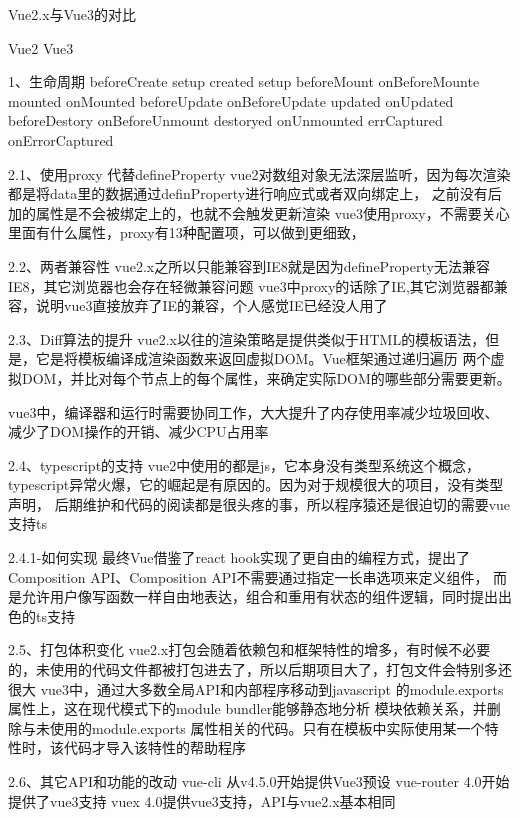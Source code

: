 Vue2.x与Vue3的对比

Vue2                                Vue3

1、生命周期
beforeCreate                        setup
created                             setup
beforeMount                         onBeforeMounte
mounted                             onMounted
beforeUpdate                        onBeforeUpdate
updated                             onUpdated
beforeDestory                       onBeforeUnmount
destoryed                           onUnmounted
errCaptured                         onErrorCaptured

2.1、使用proxy 代替defineProperty
vue2对数组对象无法深层监听，因为每次渲染都是将data里的数据通过definProperty进行响应式或者双向绑定上，
之前没有后加的属性是不会被绑定上的，也就不会触发更新渲染
vue3使用proxy，不需要关心里面有什么属性，proxy有13种配置项，可以做到更细致，

2.2、两者兼容性
vue2.x之所以只能兼容到IE8就是因为defineProperty无法兼容IE8，其它浏览器也会存在轻微兼容问题
vue3中proxy的话除了IE,其它浏览器都兼容，说明vue3直接放弃了IE的兼容，个人感觉IE已经没人用了

2.3、Diff算法的提升
vue2.x以往的渲染策略是提供类似于HTML的模板语法，但是，它是将模板编译成渲染函数来返回虚拟DOM。Vue框架通过递归遍历
两个虚拟DOM，并比对每个节点上的每个属性，来确定实际DOM的哪些部分需要更新。

vue3中，编译器和运行时需要协同工作，大大提升了内存使用率减少垃圾回收、减少了DOM操作的开销、减少CPU占用率


2.4、typescript的支持
vue2中使用的都是js，它本身没有类型系统这个概念，typescript异常火爆，它的崛起是有原因的。因为对于规模很大的项目，没有类型声明，
后期维护和代码的阅读都是很头疼的事，所以程序猿还是很迫切的需要vue支持ts

2.4.1-如何实现
最终Vue借鉴了react hook实现了更自由的编程方式，提出了Composition API、Composition API不需要通过指定一长串选项来定义组件，
而是允许用户像写函数一样自由地表达，组合和重用有状态的组件逻辑，同时提出出色的ts支持


2.5、打包体积变化
vue2.x打包会随着依赖包和框架特性的增多，有时候不必要的，未使用的代码文件都被打包进去了，所以后期项目大了，打包文件会特别多还很大
vue3中，通过大多数全局API和内部程序移动到javascript 的module.exports属性上，这在现代模式下的module bundler能够静态地分析
模块依赖关系，并删除与未使用的module.exports 属性相关的代码。只有在模板中实际使用某一个特性时，该代码才导入该特性的帮助程序

2.6、其它API和功能的改动
vue-cli 从v4.5.0开始提供Vue3预设
vue-router 4.0开始提供了vue3支持
vuex 4.0提供vue3支持，API与vue2.x基本相同

